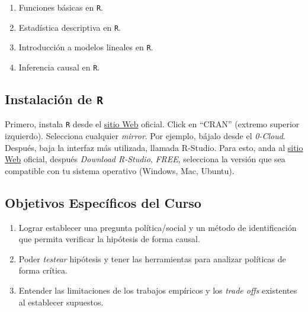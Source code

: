 \documentclass[letterpaper]{article}
\renewenvironment{itemize}{
  \begin{list}{}{
    \setlength{\leftmargin}{1.5em}
  }
}{
  \end{list}
}
\begin{document}
\begin{enumerate}
	\item Funciones b\'asicas en \texttt{R}.
	\item Estad\'istica descriptiva en \texttt{R}.
	\item Introducci\'on a modelos lineales en \texttt{R}.
 	\item Inferencia causal en \texttt{R}.
\end{enumerate}
 

\subsection*{Instalaci\'on de \texttt{R}}

Primero, instala \texttt{R} desde el \href{https://www.r-project.org/}{sitio Web} oficial. Click en ``CRAN'' (extremo superior izquierdo). Selecciona cualquier \emph{mirror}. Por ejemplo, b\'ajalo desde el \emph{0-Cloud}. Despu\'es, baja la interfaz m\'as utilizada, llamada R-Studio. Para esto, anda al \href{https://www.rstudio.com}{sitio Web} oficial, despu\'es \emph{Download R-Studio}, \emph{FREE}, selecciona la versi\'on que sea compatible con tu sistema operativo (Windows, Mac, Ubuntu).




\subsection*{Objetivos Espec\'ificos del Curso}

\begin{enumerate}
  \item Lograr establecer una pregunta pol\'itica/social y un m\'etodo de identificaci\'on que permita verificar la hip\'otesis de forma causal.
  \item Poder \emph{testear} hip\'otesis y tener las herramientas para analizar pol\'iticas de forma cr\'itica.
  \item Entender las limitaciones de los trabajos emp\'iricos y los \emph{trade offs} existentes al establecer supuestos.
\end{enumerate}
\end{document}
